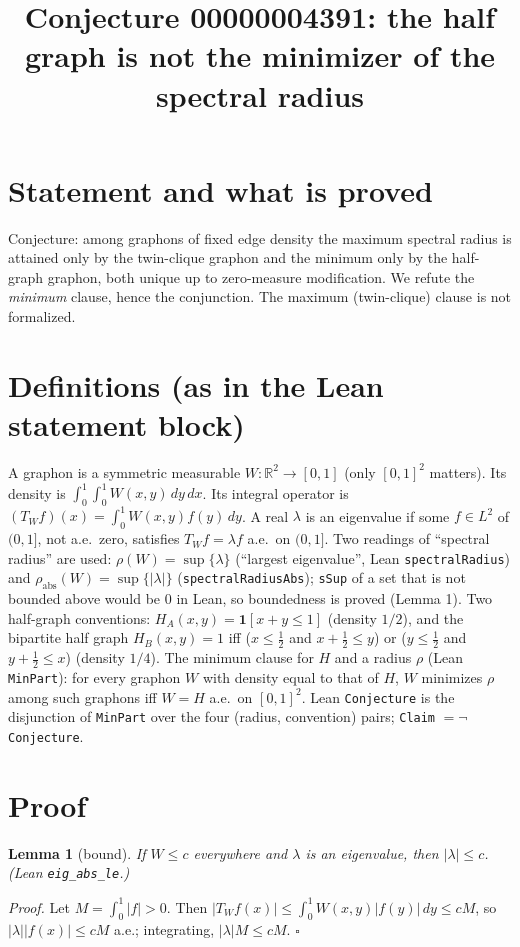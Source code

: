 \documentclass[11pt]{article}
\title{Conjecture 00000004391: the half graph is not the minimizer of the spectral radius}
\date{}
\newtheorem{lemma}{Lemma}
\begin{document}
\maketitle

\section*{Statement and what is proved}
Conjecture: among graphons of fixed edge density the maximum spectral radius is attained only by the twin-clique graphon and the minimum only by the half-graph graphon, both unique up to zero-measure modification. We refute the \emph{minimum} clause, hence the conjunction. The maximum (twin-clique) clause is not formalized.

\section*{Definitions (as in the Lean statement block)}
A graphon is a symmetric measurable $W:\mathbb{R}^2\to[0,1]$ (only $[0,1]^2$ matters). Its density is $\int_0^1\!\int_0^1 W(x,y)\,dy\,dx$. Its integral operator is $(T_Wf)(x)=\int_0^1 W(x,y)f(y)\,dy$. A real $\lambda$ is an eigenvalue if some $f\in L^2$ of $(0,1]$, not a.e.\ zero, satisfies $T_Wf=\lambda f$ a.e.\ on $(0,1]$. Two readings of ``spectral radius'' are used: $\rho(W)=\sup\{\lambda\}$ (``largest eigenvalue'', Lean \texttt{spectralRadius}) and $\rho_{\mathrm{abs}}(W)=\sup\{|\lambda|\}$ (\texttt{spectralRadiusAbs}); \texttt{sSup} of a set that is not bounded above would be $0$ in Lean, so boundedness is proved (Lemma 1). Two half-graph conventions: $H_A(x,y)=\mathbf 1[x+y\le1]$ (density $1/2$), and the bipartite half graph $H_B(x,y)=1$ iff ($x\le\frac12$ and $x+\frac12\le y$) or ($y\le\frac12$ and $y+\frac12\le x$) (density $1/4$). The minimum clause for $H$ and a radius $\rho$ (Lean \texttt{MinPart}): for every graphon $W$ with density equal to that of $H$, $W$ minimizes $\rho$ among such graphons iff $W=H$ a.e.\ on $[0,1]^2$. Lean \texttt{Conjecture} is the disjunction of \texttt{MinPart} over the four (radius, convention) pairs; \texttt{Claim} $=\neg$\texttt{Conjecture}.

\section*{Proof}
\begin{lemma}[bound] If $W\le c$ everywhere and $\lambda$ is an eigenvalue, then $|\lambda|\le c$. (Lean \texttt{eig\_abs\_le}.)\end{lemma}
\emph{Proof.} Let $M=\int_0^1|f|>0$. Then $|T_Wf(x)|\le\int_0^1 W(x,y)|f(y)|\,dy\le cM$, so $|\lambda||f(x)|\le cM$ a.e.; integrating, $|\lambda|M\le cM$. $\square$
\end{document}
